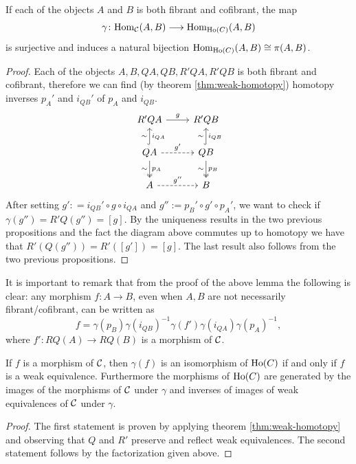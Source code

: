 \begin{lemma}
	\label{lem:induced-homiso}
	If each of the objects $A$ and $B$ is both fibrant and cofibrant, the map 
	\[\gamma \colon \mathrm{Hom}_{\mathcal{C}}(A,B) \longrightarrow \mathrm{Hom}_{\mathrm{Ho}(C)}(A,B) \]
	is surjective and induces a natural bijection $\mathrm{Hom}_{\mathrm{Ho}(C)}(A,B) \cong \pi(A, B)$.
\end{lemma}
\begin{proof}
	Each of the objects $A,B,QA,QB,R'QA,R'QB$ is both fibrant and cofibrant, therefore we can find (by theorem \ref{thm:weak-homotopy}) homotopy inverses $p_A'$ and $i_{QB}'$ of $p_A$ and $i_{QB}$. 
	\[\begin{tikzcd}
		{R'QA} & {R'QB} \\
		QA & QB \\
		A & B
		\arrow["g", from=1-1, to=1-2]
		\arrow["{i_{QA}}"', "\sim", hook, from=2-1, to=1-1]
		\arrow["{p_A}", "\sim"', two heads, from=2-1, to=3-1]
		\arrow["{i_{QB}}"', "\sim", hook, from=2-2, to=1-2]
		\arrow["{p_B}", "\sim"', two heads, from=2-2, to=3-2]
		\arrow["{g''}", dashed, from=3-1, to=3-2]
		\arrow["{g'}", dashed, from=2-1, to=2-2]
	\end{tikzcd}\]
	After setting $g' : = i_{QB}'\circ g\circ i_{QA}$ and $g'' := p_B'\circ g'\circ p_A'$, we want to check if $\gamma(g'') = R'Q(g'') = [g]$. By the uniqueness results in the two previous propositions and the fact the diagram above commutes up to homotopy we have that $R'(Q(g'')) = R'([g']) = [g]$. The last result also follows from the two previous propositions.
\end{proof}

 It is important to remark that from the proof of the above lemma the following is clear: any morphism $f \colon A \longrightarrow B$, even when $A,B$ are not necessarily fibrant/cofibrant, can be written as \[ f = \gamma (p_B) \gamma(i_{QB})^{-1} \gamma(f') \gamma(i_{QA})\gamma(p_A)^{-1}, \] where $f'\colon RQ(A) \longrightarrow RQ(B)$ is a morphism of $\mathcal{C}$.

 \begin{lemma}
	\label{lem:generation-htp}
	If $f$ is a morphism of $\mathcal{C}$, then $\gamma(f)$ is an isomorphism of $\mathrm{Ho}(C)$ if and only if $f$ is a weak equivalence. Furthermore the morphisms of $\mathrm{Ho}(C)$ are generated by the images of the morphisms of $\mathcal{C}$ under $\gamma$ and inverses of images of weak equivalences of $\mathcal{C}$ under $\gamma$. 
 \end{lemma}
 \begin{proof}
	The first statement is proven by applying theorem \ref{thm:weak-homotopy} and observing that $Q$ and $R'$ preserve and reflect weak equivalences. The second statement follows by the factorization given above.
 \end{proof}

